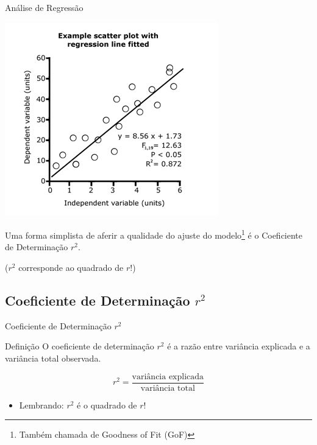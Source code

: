 \documentclass{beamer}
\begin{document}
\begin{frame}{\scriptsize Análise de Regressão}
  \begin{center}
      \includegraphics[height=0.6\textheight]{Cap18-19/residuos2}
  \end{center}
  \begin{center}
    \small
    Uma forma \alert{simplista} de aferir a qualidade do ajuste do modelo\footnote{Também chamada de Goodness of Fit (GoF)} é o Coeficiente de Determinação $r^2$.

    \medskip
    {\scriptsize ($r^2$ corresponde ao quadrado de $r$!)}
  \end{center}
\end{frame}


\subsection[$r^2$]{Coeficiente de Determinação $r^2$}

\begin{frame}{\scriptsize Coeficiente de Determinação $r^2$}
  \begin{block}{Definição}
    \footnotesize
    O \alert{coeficiente de determinação} $r^2$ é a razão entre
    variância explicada e a variância total observada.
  \end{block}
  \begin{displaymath}
    r^2 = \frac{\text{variância explicada}}{\text{variância total}}
  \end{displaymath}
  \begin{itemize}
  \item Lembrando: $r^2$ é o quadrado de $r$!
  \end{itemize}
\end{frame}
\end{document}
